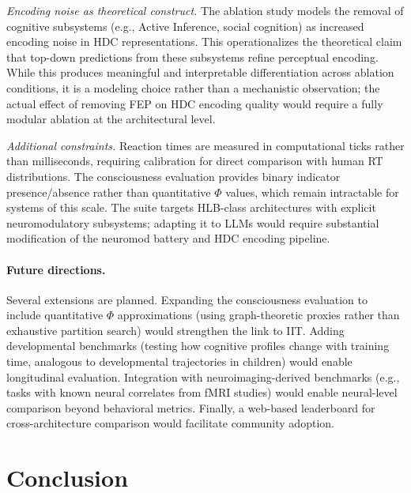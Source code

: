 \documentclass[11pt,letterpaper]{article}
\newcommand{\hlb}{\textsc{HLB}}
\begin{document}
\emph{Encoding noise as theoretical construct.} The ablation study models the removal of cognitive subsystems (e.g., Active Inference, social cognition) as increased encoding noise in HDC representations. This operationalizes the theoretical claim that top-down predictions from these subsystems refine perceptual encoding. While this produces meaningful and interpretable differentiation across ablation conditions, it is a modeling choice rather than a mechanistic observation; the actual effect of removing FEP on HDC encoding quality would require a fully modular ablation at the architectural level.

\emph{Additional constraints.} Reaction times are measured in computational ticks rather than milliseconds, requiring calibration for direct comparison with human RT distributions. The consciousness evaluation provides binary indicator presence/absence rather than quantitative $\Phi$ values, which remain intractable for systems of this scale. The suite targets \hlb{}-class architectures with explicit neuromodulatory subsystems; adapting it to LLMs would require substantial modification of the neuromod battery and HDC encoding pipeline.

\paragraph{Future directions.} Several extensions are planned. Expanding the consciousness evaluation to include quantitative $\Phi$ approximations (using graph-theoretic proxies rather than exhaustive partition search) would strengthen the link to IIT. Adding developmental benchmarks (testing how cognitive profiles change with training time, analogous to developmental trajectories in children) would enable longitudinal evaluation. Integration with neuroimaging-derived benchmarks (e.g., tasks with known neural correlates from fMRI studies) would enable neural-level comparison beyond behavioral metrics. Finally, a web-based leaderboard for cross-architecture comparison would facilitate community adoption.

\section{Conclusion}
\label{sec:conclusion}
\end{document}
